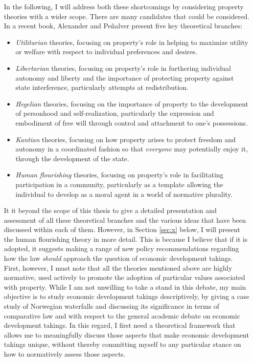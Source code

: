 In the following, I will address both these shortcomings by considering property theories with a wider scope. There are many candidates that could be considered. In a recent book, Alexander and Pe\~{n}alver present five key theoretical branches: 
\begin{itemize}
\item {\it Utilitarian} theories, focusing on property's role in helping to maximize utility or welfare with respect to individual preferences and desires. 
\item {\it Libertarian} theories, focusing on property's role in furthering individual autonomy and liberty and the importance of protecting property against state interference, particularly attempts at redistribution. 
\item {\it Hegelian} theories, focusing on the importance of property to the development of personhood and self-realization, particularly the expression and embodiment of free will through control and attachment to one's possessions. 
\item {\it Kantian} theories, focusing on how property arises to protect freedom and autonomy in a coordinated fashion so that {\it everyone} may potentially enjoy it, through the development of the state. 
\item {\it  Human flourishing} theories, focusing on property's role in facilitating participation in a community, particularly as a template allowing the individual to develop as a moral agent in a world of normative plurality.
\end{itemize}

It it beyond the scope of this thesis to give a detailed presentation and assessment of all these theoretical branches and the various ideas that have been discussed within each of them. However, in Section \ref{sec:x} below, I will present the human flourishing theory in more detail. This is because I believe that if it is adopted, it suggests making a range of new policy recommendations regarding how the law {\it should} approach the question of economic development takings. First, however, I must note that all the theories mentioned above are highly normative, used actively to promote the adoption of particular values associated with property. While I am not unwilling to take a stand in this debate, my main objective is to study economic development takings descriptively, by giving a case study of Norwegian waterfalls and discussing its significance in terms of comparative law and with respect to the general academic debate on economic development takings. In this regard, I first need a theoretical framework that allows me to meaningfully discuss those aspects that make economic development takings unique, without thereby committing myself to any particular stance on how to normatively assess those aspects. 

